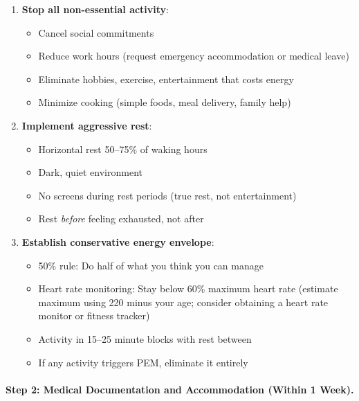 \begin{enumerate}
    \item \textbf{Stop all non-essential activity}:
    \begin{itemize}
        \item Cancel social commitments
        \item Reduce work hours (request emergency accommodation or medical leave)
        \item Eliminate hobbies, exercise, entertainment that costs energy
        \item Minimize cooking (simple foods, meal delivery, family help)
    \end{itemize}

    \item \textbf{Implement aggressive rest}:
    \begin{itemize}
        \item Horizontal rest 50--75\% of waking hours
        \item Dark, quiet environment
        \item No screens during rest periods (true rest, not entertainment)
        \item Rest \emph{before} feeling exhausted, not after
    \end{itemize}

    \item \textbf{Establish conservative energy envelope}:
    \begin{itemize}
        \item 50\% rule: Do half of what you think you can manage
        \item Heart rate monitoring: Stay below 60\% maximum heart rate (estimate maximum using 220 minus your age; consider obtaining a heart rate monitor or fitness tracker)
        \item Activity in 15--25 minute blocks with rest between
        \item If any activity triggers PEM, eliminate it entirely
    \end{itemize}
\end{enumerate}

\paragraph{Step 2: Medical Documentation and Accommodation (Within 1 Week).}

